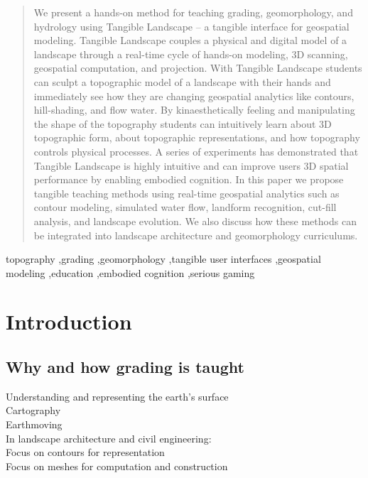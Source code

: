 \documentclass[final,3p,times,twocolumn]{elsarticle}
\begin{document}
\begin{frontmatter}
\begin{abstract}
We present a hands-on method for teaching grading, geomorphology, and hydrology 
using Tangible Landscape -- a tangible interface for geospatial modeling. 
Tangible Landscape couples a physical and digital model of a landscape 
through a real-time cycle 
of hands-on modeling, 3D scanning, geospatial computation, and projection.
With Tangible Landscape students
can sculpt a topographic model of a landscape with their hands
and immediately see how they are changing geospatial analytics like
contours, hill-shading, and flow water. 
By kinaesthetically feeling and manipulating the shape of the topography 
students can intuitively learn about 3D topographic form, 
about topographic representations, and how topography controls physical processes.
A series of experiments has demonstrated that Tangible Landscape 
is highly intuitive and 
can improve users 3D spatial performance
by enabling embodied cognition.
In this paper we propose tangible teaching methods 
using real-time geospatial analytics such as 
contour modeling, simulated water flow, landform recognition, 
cut-fill analysis, and landscape evolution. 
We also discuss how these methods can be integrated into 
landscape architecture and geomorphology curriculums. %
\end{abstract}

\begin{keyword}
topography \sep grading \sep geomorphology \sep tangible user interfaces \sep geospatial modeling \sep education \sep embodied cognition \sep serious gaming
\end{keyword}

\end{frontmatter}

\tableofcontents
\vfil
\pagebreak


\section{Introduction}\label{intro}
\subsection{Why and how grading is taught}
\noindent
Understanding and representing the earth's surface \\
Cartography \\
Earthmoving \\
In landscape architecture and civil engineering: \\
Focus on contours for representation \\
Focus on meshes for computation and construction \\
\end{document}
